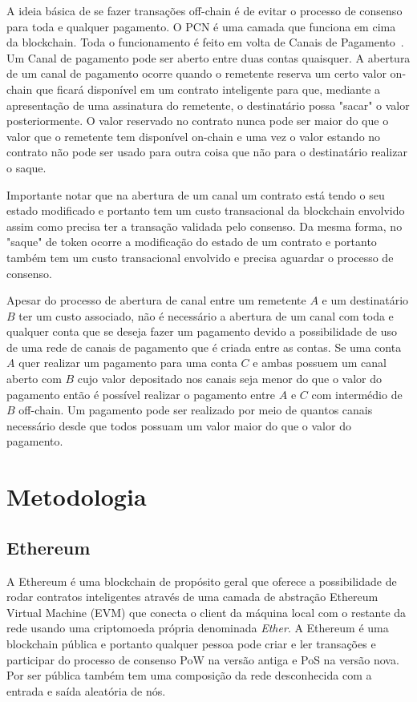 \documentclass[12pt]{article}
\begin{document}
A ideia básica de se fazer transações off-chain é de evitar o processo de consenso para toda e qualquer pagamento. O PCN é uma camada que funciona em cima da blockchain. Toda o funcionamento é feito em volta de Canais de Pagamento~\cite{raidenmedium}. Um Canal de pagamento pode ser aberto entre duas contas quaisquer. A abertura de um canal de pagamento ocorre quando o remetente reserva um certo valor on-chain que ficará disponível em um contrato inteligente para que, mediante a apresentação de uma assinatura do remetente, o destinatário possa "sacar" o valor posteriormente. O valor reservado no contrato nunca pode ser maior do que o valor que o remetente tem disponível on-chain e uma vez o valor estando no contrato não pode ser usado para outra coisa que não para o destinatário realizar o saque.

Importante notar que na abertura de um canal um contrato está tendo o seu estado modificado e portanto tem um custo transacional da blockchain envolvido assim como precisa ter a transação validada pelo consenso. Da mesma forma, no "saque" de token ocorre a modificação do estado de um contrato e portanto também tem um custo transacional envolvido e precisa aguardar o processo de consenso.

Apesar do processo de abertura de canal entre um remetente $A$ e um destinatário $B$ ter um custo associado, não é necessário a abertura de um canal com toda e qualquer conta que se deseja fazer um pagamento devido a possibilidade de uso de uma rede de canais de pagamento que é criada entre as contas. Se uma conta $A$ quer realizar um pagamento para uma conta $C$ e ambas possuem um canal aberto com $B$ cujo valor depositado nos canais seja menor do que o valor do pagamento então é possível realizar o pagamento entre $A$ e $C$ com intermédio de $B$ off-chain. Um pagamento pode ser realizado por meio de quantos canais necessário desde que todos possuam um valor maior do que o valor do pagamento.

\section{Metodologia}
     
\subsection{Ethereum}

A Ethereum é uma blockchain de propósito geral que oferece a possibilidade de rodar contratos inteligentes através de uma camada de abstração Ethereum Virtual Machine (EVM) que conecta o client da máquina local com o restante da rede usando uma criptomoeda própria denominada \textit{Ether}\cite{ethereum2021oficial}. A Ethereum é uma blockchain pública e portanto qualquer pessoa pode criar e ler transações e participar do processo de consenso PoW na versão antiga e PoS na versão nova. Por ser pública também tem uma composição da rede desconhecida com a entrada e saída aleatória de nós. 
\end{document}

